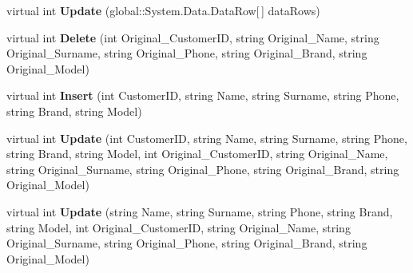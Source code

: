 \begin{DoxyCompactItemize}
virtual int {\bfseries Update} (global\+::\+System.\+Data.\+Data\+Row\mbox{[}$\,$\mbox{]} data\+Rows)
\item 
\mbox{\label{classprojekt__grupowy_1_1database_data_set1_table_adapters_1_1_table_table_adapter_a899333eb1375b0f5a55b66d24def491e}} 
virtual int {\bfseries Delete} (int Original\+\_\+\+Customer\+ID, string Original\+\_\+\+Name, string Original\+\_\+\+Surname, string Original\+\_\+\+Phone, string Original\+\_\+\+Brand, string Original\+\_\+\+Model)
\item 
\mbox{\label{classprojekt__grupowy_1_1database_data_set1_table_adapters_1_1_table_table_adapter_a1237de20ecf9571ab5b63074a94d61a4}} 
virtual int {\bfseries Insert} (int Customer\+ID, string Name, string Surname, string Phone, string Brand, string Model)
\item 
\mbox{\label{classprojekt__grupowy_1_1database_data_set1_table_adapters_1_1_table_table_adapter_aa2fe5234ce8dd95214a82117bbd7cadc}} 
virtual int {\bfseries Update} (int Customer\+ID, string Name, string Surname, string Phone, string Brand, string Model, int Original\+\_\+\+Customer\+ID, string Original\+\_\+\+Name, string Original\+\_\+\+Surname, string Original\+\_\+\+Phone, string Original\+\_\+\+Brand, string Original\+\_\+\+Model)
\item 
\mbox{\label{classprojekt__grupowy_1_1database_data_set1_table_adapters_1_1_table_table_adapter_a1267627bd5da469bda400434a2e1af5e}} 
virtual int {\bfseries Update} (string Name, string Surname, string Phone, string Brand, string Model, int Original\+\_\+\+Customer\+ID, string Original\+\_\+\+Name, string Original\+\_\+\+Surname, string Original\+\_\+\+Phone, string Original\+\_\+\+Brand, string Original\+\_\+\+Model)
\end{DoxyCompactItemize}
